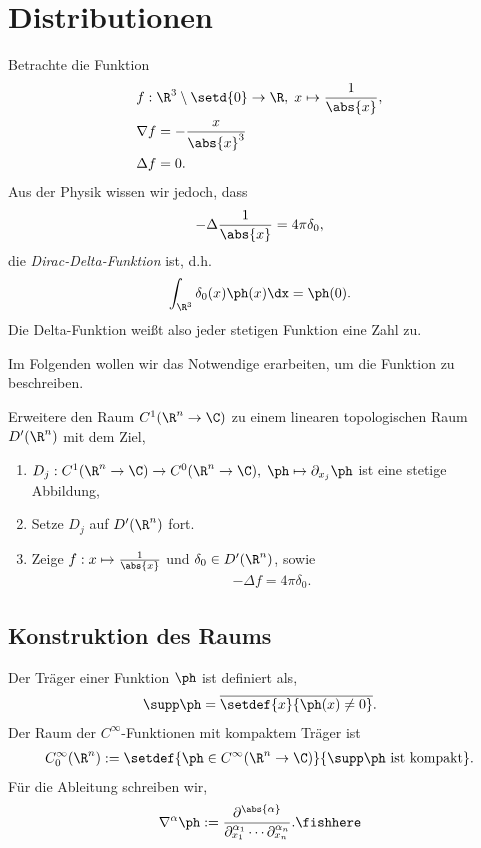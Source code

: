 \section{Distributionen}

Betrachte die Funktion
\begin{align*}
&f: \R^3\setminus\setd{0} \to \R,\; x\mapsto \frac{1}{\abs{x}},\\
&\nabla f = -\frac{x}{\abs{x}^3}\\
&\Delta f = 0.
\end{align*}
Aus der Physik wissen wir jedoch, dass
\begin{align*}
-\Delta \frac{1}{\abs{x}} = 4\pi \delta_0,
\end{align*}
die \emph{Dirac-Delta-Funktion} ist, d.h.
\begin{align*}
\int_{\R^3}\delta_0(x)\ph(x)\dx = \ph(0).
\end{align*}
Die Delta-Funktion weißt also jeder stetigen Funktion eine Zahl zu.

Im Folgenden wollen wir das Notwendige erarbeiten, um die Funktion zu
beschreiben.
\begin{bemn}[Arbeitsgebiet.]
Erweitere den Raum $C^1(\R^n\to\C)$ zu einem linearen topologischen Raum
$D'(\R^n)$ mit dem Ziel,
\begin{enumerate}[label=(\roman{*})]
  \item $D_j : C^1(\R^n\to\C) \to C^0(\R^n\to\C),\; \ph\mapsto \partial_{x_j}
  \ph$ ist eine stetige Abbildung,
  \item Setze $D_j$ auf $D'(\R^n)$ fort.
  \item Zeige $f: x\mapsto \frac{1}{\abs{x}}$ und $\delta_0\in D'(\R^n)$, sowie
\begin{align*}
-\Delta f = 4\pi \delta_0.
\end{align*}
\end{enumerate}
\end{bemn}

\subsection{Konstruktion des Raums}

\begin{defn}[Notation]
\label{defn:3.1}
Der Träger einer Funktion $\ph$ ist definiert als,
\begin{align*}
\supp\ph = \overline{\setdef{x}{\ph(x)\neq 0}}.
\end{align*}
Der Raum der $C^\infty$-Funktionen mit kompaktem Träger ist
\begin{align*}
C_0^\infty(\R^n) := \setdef{\ph\in C^\infty(\R^n\to\C)}{\supp \ph \text{ ist
kompakt}}.
\end{align*}
Für die Ableitung schreiben wir,
\begin{align*}
\nabla^\alpha \ph :=
\frac{\partial^{\abs{\alpha}}}{\partial_{x_1}^{\alpha_1}\cdots
\partial_{x_n}^{\alpha_n}}.\fishhere
\end{align*}
\end{defn}

